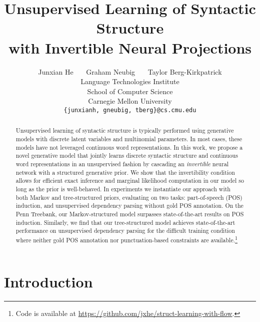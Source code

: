 \documentclass[11pt,a4paper]{article}
\title{Unsupervised Learning of Syntactic Structure \\ with Invertible Neural Projections}
\author{Junxian He \ \ \
  Graham Neubig \ \ \
  Taylor Berg-Kirkpatrick\\
  Language Technologies Institute \\
  School of Computer Science \\
  Carnegie Mellon University \\
  {\tt \{junxianh, gneubig, tberg\}@cs.cmu.edu}\\}
\date{}
\begin{document}
\maketitle
\begin{abstract}
Unsupervised learning of syntactic structure is typically performed using generative models with discrete latent variables and multinomial parameters. In most cases, these models have not leveraged continuous word representations. In this work, we propose a novel generative model that jointly learns discrete syntactic structure and continuous word representations in an unsupervised fashion by cascading an \textit{invertible} neural network with a structured generative prior. We show that the invertibility condition allows for efficient exact inference and marginal likelihood computation in our model so long as the prior is well-behaved. 
In experiments we instantiate our approach with both Markov and tree-structured priors, evaluating on two tasks: part-of-speech (POS) induction, and unsupervised dependency parsing without gold POS annotation. On the Penn Treebank, our Markov-structured model surpasses state-of-the-art results on POS induction. Similarly, we find that our tree-structured model achieves state-of-the-art performance on unsupervised dependency parsing for the difficult training condition where neither gold POS annotation nor punctuation-based constraints are available.\footnote{Code is available at \href{https://github.com/jxhe/struct-learning-with-flow}{https://github.com/jxhe/struct-learning-with-flow}.}

\end{abstract}

\section{Introduction}
\end{document}
